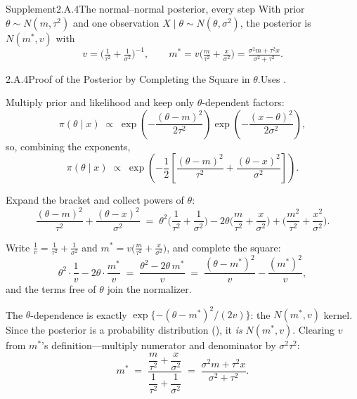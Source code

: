 \documentclass[main.tex]{subfiles}
\begin{document}
\begin{ObjL}{Supplement}{2.A.4}{The normal--normal posterior, every step}
With prior $\theta\sim N(m,\tau^2)$ and one observation $X\mid\theta\sim N(\theta,\sigma^2)$,
the posterior is $N(m^*,v)$ with
\[ v=\Big(\tfrac{1}{\tau^2}+\tfrac{1}{\sigma^2}\Big)^{-1} , \qquad
   m^{*}=v\Big(\tfrac{m}{\tau^2}+\tfrac{x}{\sigma^2}\Big)
   =\tfrac{\sigma^2 m+\tau^2 x}{\sigma^2+\tau^2} . \]
\end{ObjL}
\begin{Prf}{2.A.4}{Proof of the Posterior by Completing the Square in $\theta$.}{Uses .}
\item Multiply prior and likelihood and keep only $\theta$-dependent factors:
      \[ \pi(\theta\mid x) \;\propto\;
         \exp\!\left( -\frac{(\theta-m)^2}{2\tau^2} \right)
         \exp\!\left( -\frac{(x-\theta)^2}{2\sigma^2} \right) , \]
      so, combining the exponents,
      \[ \pi(\theta\mid x) \;\propto\;
         \exp\!\left( -\frac12\left[ \frac{(\theta-m)^2}{\tau^2}
         + \frac{(\theta-x)^2}{\sigma^2} \right] \right) . \]
\item Expand the bracket and collect powers of $\theta$:
      \[ \frac{(\theta-m)^2}{\tau^2}+\frac{(\theta-x)^2}{\sigma^2}
         \;=\; \theta^2\Big(\frac{1}{\tau^2}+\frac{1}{\sigma^2}\Big)
         - 2\theta\Big(\frac{m}{\tau^2}+\frac{x}{\sigma^2}\Big)
         + \Big(\frac{m^2}{\tau^2}+\frac{x^2}{\sigma^2}\Big) . \]
\item Write $\frac1v=\frac{1}{\tau^2}+\frac{1}{\sigma^2}$ and
      $m^*=v\big(\frac{m}{\tau^2}+\frac{x}{\sigma^2}\big)$, and complete the square:
      \[ \theta^2\cdot\frac1v - 2\theta\cdot\frac{m^*}{v}
         \;=\; \frac{\theta^2 - 2\theta\, m^*}{v}
         \;=\; \frac{(\theta-m^*)^2}{v} - \frac{(m^*)^2}{v} , \]
      and the terms free of $\theta$ join the normalizer.
\item The $\theta$-dependence is exactly $\exp\{-(\theta-m^*)^2/(2v)\}$: the $N(m^*,v)$
      kernel. Since the posterior is a probability distribution (), it \emph{is}
      $N(m^*,v)$. Clearing $v$ from $m^*$'s definition---multiply numerator and denominator
      by $\sigma^2\tau^2$:
      \[ m^* \;=\; \frac{\dfrac{m}{\tau^2}+\dfrac{x}{\sigma^2}}
         {\dfrac{1}{\tau^2}+\dfrac{1}{\sigma^2}}
         \;=\; \frac{\sigma^2 m+\tau^2 x}{\sigma^2+\tau^2} . \]
\end{Prf}
\end{document}

